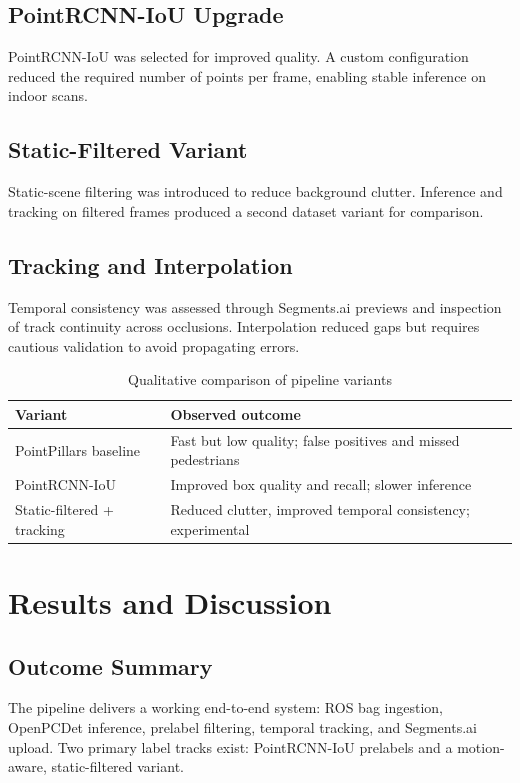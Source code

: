 \documentclass[a4paper,12pt]{report}
\begin{document}
\section{PointRCNN-IoU Upgrade}
PointRCNN-IoU was selected for improved quality. A custom configuration reduced the required number of points per frame, enabling stable inference on indoor scans.

\section{Static-Filtered Variant}
Static-scene filtering was introduced to reduce background clutter. Inference and tracking on filtered frames produced a second dataset variant for comparison.

\section{Tracking and Interpolation}
Temporal consistency was assessed through Segments.ai previews and inspection of track continuity across occlusions. Interpolation reduced gaps but requires cautious validation to avoid propagating errors.

\begin{table}[H]
\centering
\caption{Qualitative comparison of pipeline variants}
\label{tab:qualitative}
\begin{tabular}{p{} p{}}
\toprule
Variant & Observed outcome \\
\midrule
PointPillars baseline & Fast but low quality; false positives and missed pedestrians \\
PointRCNN-IoU & Improved box quality and recall; slower inference \\
Static-filtered + tracking & Reduced clutter, improved temporal consistency; experimental \\
\bottomrule
\end{tabular}
\end{table}

\chapter{Results and Discussion}
\section{Outcome Summary}
The pipeline delivers a working end-to-end system: ROS bag ingestion, OpenPCDet inference, prelabel filtering, temporal tracking, and Segments.ai upload. Two primary label tracks exist: PointRCNN-IoU prelabels and a motion-aware, static-filtered variant.
\end{document}
